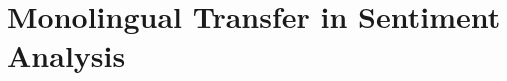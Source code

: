 \chapter{Monolingual Transfer in Sentiment Analysis}
\label{chapter:multilingual_sentiment_analysis}